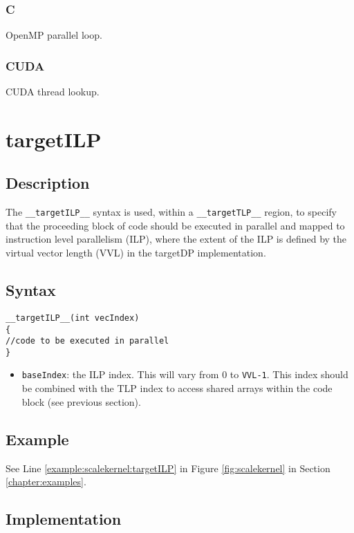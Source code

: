 \subsubsection{C}
OpenMP parallel loop.
\subsubsection{CUDA}
CUDA thread lookup.

\newpage
\section{targetILP}\label{sec:ILP}

\subsection{Description}

The \verb+__targetILP__+ syntax is used, within a \verb+__targetTLP__+
region, to specify that the proceeding block of code should be
executed in parallel and mapped to instruction level parallelism
(ILP), where the extent of the ILP is defined by the virtual vector length (VVL) in the targetDP implementation. 
\begin{comment}
need to document VVL in more detail somewhere and link.
\end{comment}

\subsection{Syntax}
\begin{verbatim}
__targetILP__(int vecIndex) 
{
//code to be executed in parallel
}
\end{verbatim}

\begin{itemize}
\item \verb+baseIndex+: the ILP index. This will vary from 0 to \verb+VVL-1+.  This index should be combined with the TLP index to access shared arrays within the code block (see previous section).
\end{itemize}


\subsection{Example}
See Line \ref{example:scalekernel:targetILP} in Figure \ref{fig:scalekernel} in Section \ref{chapter:examples}.

\subsection{Implementation}
